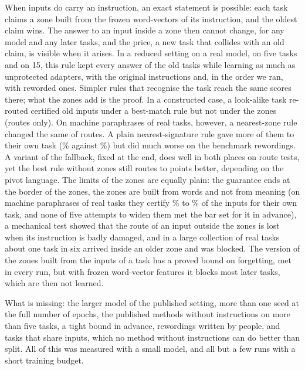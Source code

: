 When inputs do carry an instruction, an exact statement is possible: each task claims a zone built
from the frozen word-vectors of its instruction, and the oldest claim wins. The answer to an input
inside a zone then cannot change, for any model and any later tasks, and the price, a new task that
collides with an old claim, is visible when it arises. In a reduced setting on a real model, on five
tasks and on 15, this rule kept every answer of the old tasks while learning as much as unprotected
adapters, with the original instructions and, in the order we ran, with reworded ones. Simpler rules
that recognise the task reach the same scores there; what the zones add is the proof. In a
constructed case, a look-alike task re-routed certified old inputs under a best-match rule but not
under the zones (routes only). On machine paraphrases of real tasks, however, a nearest-zone rule
changed the same \RerouteNearNChanged{} of \RerouteInputs{} routes. A plain nearest-signature rule
gave more of them to their own task (\RerouteSigOwnEnd{}\% against \RerouteCertOwnEnd{}\%) but did
much worse on the benchmark rewordings. A variant of the fallback, fixed at the end, does well in
both places on route tests, yet the best rule without zones still routes \RerouteZonesCost{} to \RerouteZonesCostEs{} points better, depending on the pivot language. The limits of the zones are equally
plain: the guarantee ends at the border of the zones, the zones are built from words and not from
meaning (on machine paraphrases of real tasks they certify \WidenRefTfivePLow{}\% to \WidenRefTfivePHigh{}\% of the inputs for their own task, and none of five attempts to widen
them met the bar set for it in advance), a mechanical test showed that the route of an input outside the zones is lost when its
instruction is badly damaged, and in a large collection of real tasks about one task in six arrived
inside an older zone and was blocked. The version of the zones built from the inputs of a task has a proved bound on forgetting, met in every run, but with frozen word-vector features it blocks most later tasks, which are then not learned.

What is missing: the larger model of the published setting, more than one seed at the full number of epochs, the published methods without instructions on more than five tasks, a
tight bound in advance, rewordings written by people, and tasks that share inputs, which no method without
instructions can do better than split. All of this was measured with a small model, and all but a few runs with a short training budget.

